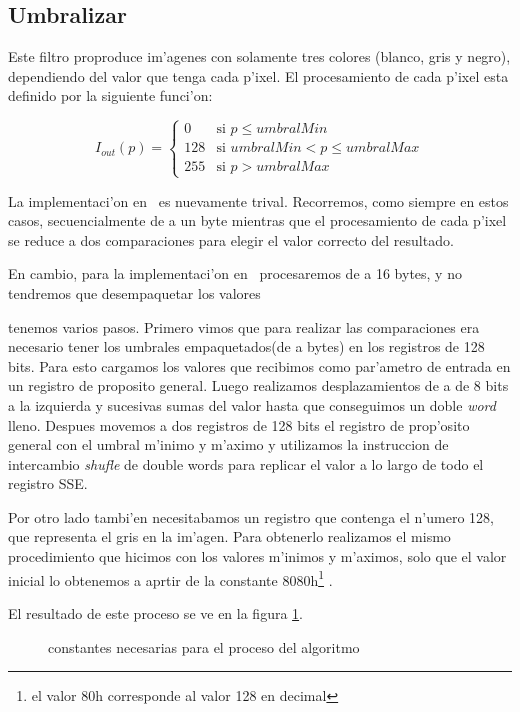 \subsection{Umbralizar}
Este filtro proproduce im'agenes con solamente tres colores (blanco, gris y negro), dependiendo del valor que tenga cada p'ixel.
El procesamiento de cada p'ixel esta definido por la siguiente funci'on:

$$I_{out}(p) = \left\{\begin{array}{lcc} 0 & \text{si } p \leq umbralMin\\  128 & \text{si } umbralMin < p \leq umbralMax \\ 255 & \text{si } p > umbralMax \end{array} \right. $$

La implementaci'on en \C\ es nuevamente trival. Recorremos, como siempre en estos casos, secuencialmente de a un byte mientras que el procesamiento de cada p'ixel se reduce a dos comparaciones para elegir el valor correcto del resultado.

En cambio, para la implementaci'on en \ass\ procesaremos de a 16 bytes, y no tendremos que desempaquetar los valores

tenemos varios pasos. Primero vimos que para realizar las comparaciones era necesario tener los umbrales empaquetados(de a bytes) en los registros de 128 bits. Para esto cargamos los valores que recibimos como par'ametro de entrada en un registro de proposito general. Luego realizamos desplazamientos de a de 8 bits a la izquierda y sucesivas sumas del valor hasta que conseguimos un doble \textit{word} lleno. Despues movemos a dos registros de 128 bits el registro de prop'osito general con el umbral m'inimo y m'aximo y utilizamos la instruccion de intercambio \textit{shufle} de double words para replicar el valor a lo largo de todo el registro SSE. 

Por otro lado tambi'en necesitabamos un registro que contenga el n'umero 128, que representa el gris en la im'agen.
Para obtenerlo realizamos el mismo procedimiento que hicimos con los valores m'inimos y m'aximos, solo que el valor inicial lo obtenemos a aprtir de la constante 8080h\footnote{el valor 80h corresponde al valor 128 en decimal} .

El resultado de este proceso se ve en la figura \ref{est:u-uno}.

\begin{figure}[h!]
\caption{constantes necesarias para el proceso del algoritmo}
\label{est:u-uno}
\end{figure}



